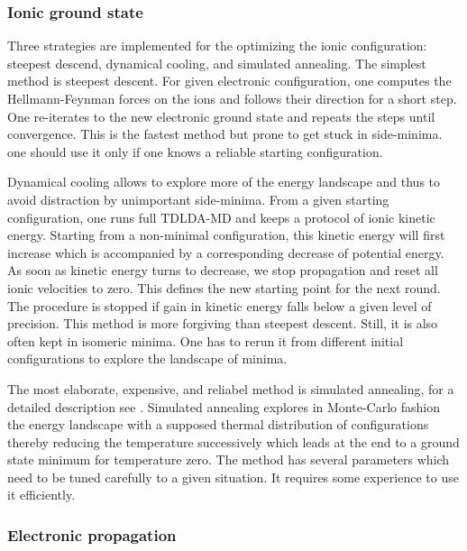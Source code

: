 \documentclass[final,1p]{elsarticle}
\begin{document}
\subsubsection{Ionic ground state}
\label{sec:numstaticion}


Three strategies are implemented for the optimizing the ionic
configuration: steepest descend, dynamical cooling, and simulated
annealing. The simplest method is steepest descent. For given
electronic configuration, one computes the Hellmann-Feynman forces on
the ions and follows their direction for a short step. One re-iterates
to the new electronic ground state and repeats the steps until
convergence. This is the fastest method but prone to get stuck in
side-minima. one should use it only if one knows a reliable starting
configuration. 

Dynamical cooling allows to explore more of the energy landscape and
thus to avoid distraction by unimportant side-minima. From a given
starting configuration, one runs full TDLDA-MD and keeps a protocol of
ionic kinetic energy. Starting from a non-minimal configuration, this
kinetic energy will first increase which is accompanied by a
corresponding decrease of potential energy. As soon as kinetic energy
turns to decrease, we stop propagation and reset all ionic velocities
to zero. This defines the new starting point for the next round.
The procedure is stopped if gain in kinetic energy falls below a given
level of precision. This method is more forgiving than steepest
descent. Still, it is also often kept in isomeric minima. One has to
rerun it from different initial configurations to explore the
landscape of minima.


The most elaborate, expensive, and reliabel method is simulated
annealing, for a detailed description see \cite{Pre92}.  Simulated
annealing explores in Monte-Carlo fashion the energy landscape with a
supposed thermal distribution of configurations thereby reducing the
temperature successively which leads at the end to a ground state
minimum for temperature zero. The method has several parameters which
need to be tuned carefully to a given situation. It requires some
experience to use it efficiently.



\subsubsection{Electronic propagation}
\label{sec:numdynel}
\end{document}
